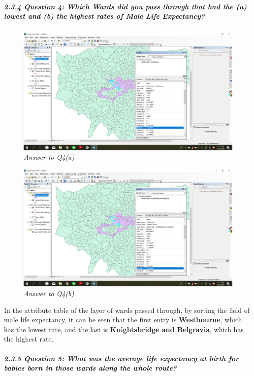 \documentclass[]{article}
\let\oldsubparagraph\subparagraph
\renewcommand{\subparagraph}[1]{\oldsubparagraph{#1}\mbox{}}
\begin{document}
\subparagraph{2.3.4 Question 4: Which Wards did you pass through that
had the (a) lowest and (b) the highest rates of Male Life
Expectancy?}\label{question-4-which-wards-did-you-pass-through-that-had-the-a-lowest-and-b-the-highest-rates-of-male-life-expectancy}

\begin{figure}
\centering
\includegraphics{Part2/pngs/Q3-1.png}
\caption{\emph{Answer to Q4(a)}}
\end{figure}

\begin{figure}
\centering
\includegraphics{Part2/pngs/Q3-2.png}
\caption{\emph{Answer to Q4(b)}}
\end{figure}

In the attribute table of the layer of wards passed through, by sorting
the field of male life expectancy, it can be seen that the first entry
is \textbf{Westbourne}, which has the lowest rate, and the last is
\textbf{Knightsbridge and Belgravia}, which has the highest rate.

\subparagraph{2.3.5 Question 5: What was the average life expectancy at
birth for babies born in those wards along the whole
route?}\label{question-5-what-was-the-average-life-expectancy-at-birth-for-babies-born-in-those-wards-along-the-whole-route}
\end{document}
